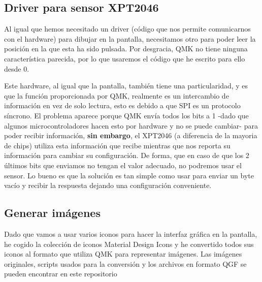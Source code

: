 \subsection{Driver para sensor XPT2046}
Al igual que hemos necesitado un driver (código que nos permite comunicarnos con el hardware) para dibujar en la pantalla, necesitamos otro para poder leer la posición en la que esta ha sido pulsada. Por desgracia, QMK no tiene ninguna característica parecida, por lo que usaremos el código\cite{touch-driver} que he escrito para ello desde 0. \par
Este hardware, al igual que la pantalla, también tiene una particularidad, y es que la función  proporcionada por QMK, realmente es un intercambio de información en vez de solo lectura, esto es debido a que SPI es un protocolo síncrono. \newline 
El problema aparece porque QMK envía todos los bits a 1 -dado que algunos microcontroladores hacen esto por hardware y no se puede cambiar- para poder recibir información, \textbf{sin embargo}, el XPT2046 (a diferencia de la mayoria de chips) utiliza esta información que recibe mientras que nos reporta su información para cambiar su configuración. De forma, que en caso de que los 2 últimos bits que enviamos no tengan el valor adecuado, no podremos usar el sensor. Lo bueno es que la solución es tan simple como usar  para enviar un byte vacío y recibir la respuesta dejando una configuración conveniente.

\subsection{Generar imágenes}
Dado que vamos a usar varios iconos para hacer la interfaz gráfica en la pantalla, he cogido la colección de iconos Material Design Icons\cite{templarian-mdi} y he convertido todos sus iconos al formato que utiliza QMK para representar imágenes. Las imágenes originales, scripts usados para la conversión y los archivos en formato QGF\cite{qgf} se pueden encontrar en este repositorio\cite{mdi-qgf}

